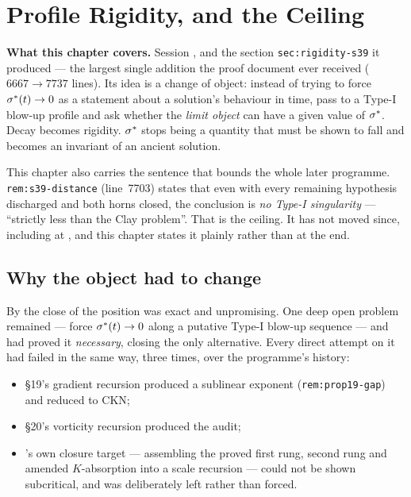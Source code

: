 \chapter{Profile Rigidity, and the Ceiling}
\label{ch:profile-rigidity}

\begin{record}
\textbf{What this chapter covers.} Session , and the section
\texttt{sec:rigidity-s39} it produced --- the largest single addition the proof
document ever received (\(6667\to7737\) lines). Its idea is a change of
object: instead of trying to force \(\sigma^{*}(t)\to0\) as a statement about a
solution's behaviour in time, pass to a Type-I blow-up profile and ask whether
the \emph{limit object} can have a given value of \(\sigma^{*}\). Decay becomes
rigidity. \(\sigma^{*}\) stops being a quantity that must be shown to fall and
becomes an invariant of an ancient solution.

\smallskip
This chapter also carries the sentence that bounds the whole later programme.
\texttt{rem:s39-distance} (line~7703) states that even with every remaining
hypothesis discharged and both horns closed, the conclusion is \emph{no
Type-I singularity} --- ``strictly less than the Clay problem''. That is the
ceiling. It has not moved since, including at , and this chapter states
it plainly rather than at the end.
\end{record}

\section{Why the object had to change}
\label{sec:why-reframe}

By the close of  the position was exact and unpromising. One deep open
problem remained --- force \(\sigma^{*}(t)\to0\) along a putative Type-I blow-up
sequence --- and  had proved it \emph{necessary}, closing the only
alternative. Every direct attempt on it had failed in the same way, three
times, over the programme's history:

\begin{itemize}[leftmargin=1.6em]
\item \S19's gradient recursion produced a sublinear exponent
  (\texttt{rem:prop19-gap}) and reduced to CKN;
\item \S20's vorticity recursion produced the  audit;
\item {}'s own closure target --- assembling the proved first rung,
  second rung and amended \(K\)-absorption into a scale recursion --- could
  not be shown subcritical, and was deliberately left \OPEN{} rather than
  forced.
\end{itemize}

